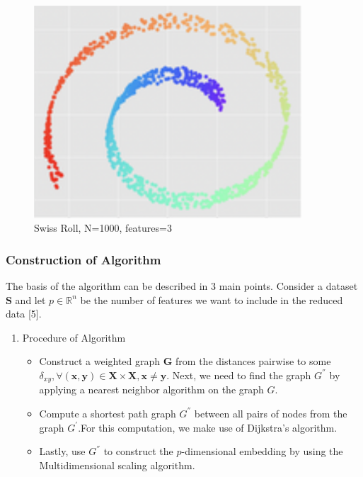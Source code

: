 \documentclass[11pt]{article}
\begin{document}
\begin{figure}[h!]
\centering    
\includegraphics[width=100mm]{swissroll1.png}
\caption{Swiss Roll, N=1000, features=3}
\label{fig: Swiss Roll}
\end{figure}

\subsubsection{Construction of Algorithm}

\hspace{5mm}The basis of the algorithm can be described in 3 main points. Consider a dataset $\textbf{S}$ and let $p\in\mathbb{R}^n$ be the number of features we want to include in the reduced data [5].

\begin{enumerate}
    \item Procedure of Algorithm
    \begin{itemize}
        \item Construct a weighted graph \textbf{G} from the distances pairwise to some \newline$\delta_{xy},\forall (\textbf{x},\textbf{y})\in \textbf{X} \times \textbf{X},\textbf{x}\neq\textbf{y}.$ Next, we need to find the graph $G^{''}$ by applying a nearest neighbor algorithm on the graph $G$.
        \item Compute a shortest path graph $G^{''}$ between all pairs of nodes from the graph $G^'$.\newline For this computation, we make use of Dijkstra’s algorithm.
        \item Lastly, use $G^{''}$ to construct the $p$-dimensional embedding by using the Multidimensional scaling algorithm.
    \end{itemize}
\end{enumerate}
\end{document}
